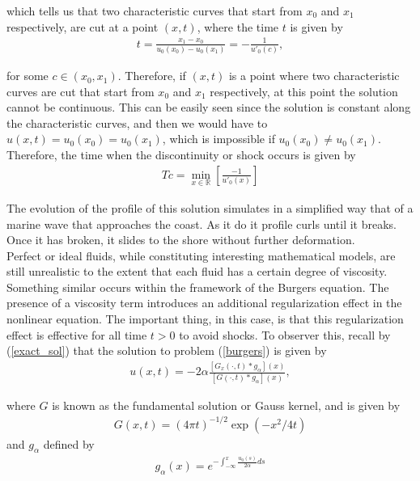 		which tells us that two characteristic curves that start from $ x_0 $ and $ x_1 $ respectively, are cut at a point $ (x, t) $, where the time $ t $ is given by
		\begin{align*}
			t = \frac{x_1 - x_0}{u_0 (x_0) - u_0 (x_1)} = - \frac{1}{u'_0(c)},
		\end{align*}
		
		for some $c \in (x_0, x_1)$. Therefore, if $(x, t)$ is a point where two characteristic curves are cut that start from $x_0$ and $x_1$ respectively, at this point the solution cannot be continuous. This can be easily seen since the solution is constant along the characteristic curves, and then we would have to $u(x, t) = u_0(x_0) = u_0(x_1)$, which is impossible if $u_0(x_0) \neq u_0(x_1)$. \\
		
		Therefore, the time when the discontinuity or shock occurs is given by
		\begin{align}
			\label{shock_time}	
			Tc = \min_{x \in \mathbb{R}} \left[  \frac{-1}{u'_0 (x)} \right]
		\end{align}
	
	The evolution of the profile of this solution simulates in a simplified way that of a marine wave that approaches the coast. As it do it profile curls until it breaks. Once it has broken, it slides to the shore without further deformation. \\
	
	Perfect or ideal fluids, while constituting interesting mathematical models, are still unrealistic to the extent that each fluid has a certain degree of viscosity. Something similar occurs within the framework of the Burgers equation. The presence of a viscosity term introduces an additional regularization effect in the nonlinear equation. The important thing, in this case, is that this regularization effect is effective for all time $ t> 0 $ to avoid shocks. To observer this, recall by (\ref{exact_sol}) that the solution to problem (\ref{burgers}) is given by
	\begin{align}
		\label{Sol_alpha}	
		u(x, t) = - 2 \alpha \frac{[G_x(\cdot, t) * g_{\alpha}] (x)}{[G(\cdot, t) * g_{\alpha}] (x)},
	\end{align}
	
	where $G$ is known as the fundamental solution or Gauss kernel, and is given by 
	\begin{align*}
		G(x, t) = (4 \pi t)^{-1/2} \exp(- x^2 / 4t)
	\end{align*}
	and $g_{\alpha}$ defined by 
	\begin{align*}
		g_{\alpha} (x) = \displaystyle e^{- \int_{-\infty}^{x} \frac{u_0 (s)}{2 \alpha} ds}
	\end{align*}
	
